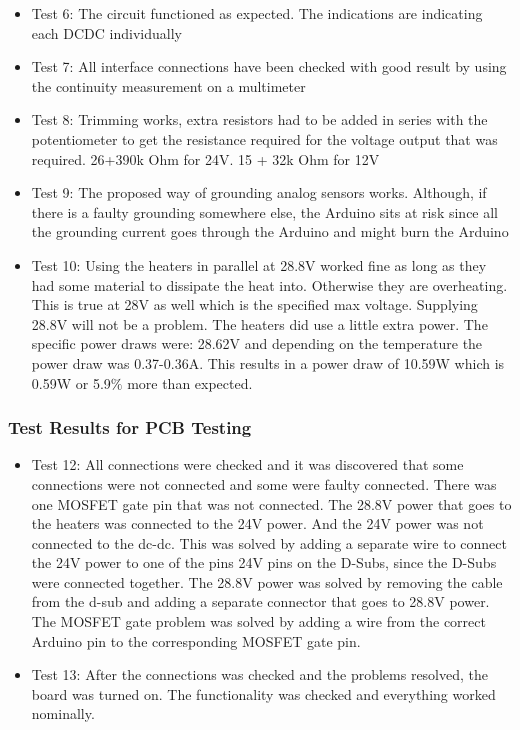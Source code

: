 \begin{itemize}
\item Test 6: The circuit functioned as expected. The indications are indicating each DCDC individually
\item Test 7: All interface connections have been checked with good result by using the continuity measurement on a multimeter
\item Test 8: Trimming works, extra resistors had to be added in series with the potentiometer to get the resistance required for the voltage output that was required. 26+390k Ohm for 24V. 15 + 32k Ohm for 12V
\item Test 9: The proposed way of grounding analog sensors works. Although, if there is a faulty grounding somewhere else, the Arduino sits at risk since all the grounding current goes through the Arduino and might burn the Arduino
\item Test 10: Using the heaters in parallel at 28.8V worked fine as long as they had some material to dissipate the heat into. Otherwise they are overheating. This is true at 28V as well which is the specified max voltage. Supplying 28.8V will not be a problem. The heaters did use a little extra power. The specific power draws were: 28.62V and depending on the temperature the power draw was 0.37-0.36A. This results in a power draw of 10.59W which is 0.59W or 5.9$\%$ more than expected.

\end{itemize}
\subsubsection{Test Results for PCB Testing}
\label{sec:Test-Results-PCB-Testing}
\begin{itemize}
    \item Test 12: All connections were checked and it was discovered that some connections were not connected and some were faulty connected. There was one MOSFET gate pin that was not connected. The 28.8V power that goes to the heaters was connected to the 24V power. And the 24V power was not connected to the dc-dc. This was solved by adding a separate wire to connect the 24V power to one of the pins 24V pins on the D-Subs, since the D-Subs were connected together. The 28.8V power was solved by removing the cable from the d-sub and adding a separate connector that goes to 28.8V power. The MOSFET gate problem was solved by adding a wire from the correct Arduino pin to the corresponding MOSFET gate pin.
    \item Test 13: After the connections was checked and the problems resolved, the board was turned on. The functionality was checked and everything worked nominally.
\end{itemize}

